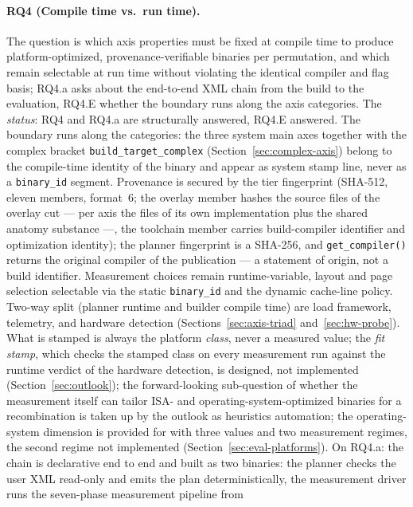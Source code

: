 \begin{nurkurz}
\paragraph{RQ4 (Compile time vs.\ run time).} The question is which axis properties must be fixed at
compile time to produce platform-optimized, provenance-verifiable binaries per permutation, and which
remain selectable at run time without violating the identical compiler and flag basis; RQ4.a asks about the
end-to-end XML chain from the build to the evaluation, RQ4.E whether the boundary runs along the axis
categories. The \emph{status}: RQ4 and RQ4.a are structurally answered, RQ4.E answered. The boundary runs
along the categories: the three system main axes together with the complex bracket
\texttt{build\_target\_complex} (Section~\ref{sec:complex-axis}) belong to the compile-time identity of the
binary and appear as system stamp line, never as a \texttt{binary\_id} segment. Provenance is secured by
the tier fingerprint (SHA-512, eleven members, format~6; the overlay member hashes the source files of the
overlay cut --- per axis the files of its own implementation plus the shared anatomy substance ---, the
toolchain member carries build-compiler identifier and optimization identity); the planner fingerprint is a
SHA-256, and \texttt{get\_compiler()} returns the original compiler of the publication --- a statement of
origin, not a build identifier. Measurement choices remain runtime-variable, layout and page selection
selectable via the static \texttt{binary\_id} and the dynamic cache-line policy. Two-way split (planner
runtime and builder compile time) are load framework, telemetry, and hardware detection
(Sections~\ref{sec:axis-triad} and~\ref{sec:hw-probe}). What is stamped is always the platform
\emph{class}, never a measured value; the \emph{fit stamp}, which checks the stamped class on every
measurement run against the runtime verdict of the hardware detection, is designed, not implemented
(Section~\ref{sec:outlook}); the forward-looking sub-question of whether the measurement itself can tailor
ISA- and operating-system-optimized binaries for a recombination is taken up by the outlook as heuristics
automation; the operating-system dimension is provided for with three values and two measurement regimes,
the second regime not implemented (Section~\ref{sec:eval-platforms}). On RQ4.a: the chain is declarative
end to end and built as two binaries: the planner checks the user XML read-only and emits the plan
deterministically, the measurement driver runs the seven-phase measurement pipeline from

\end{nurkurz}
